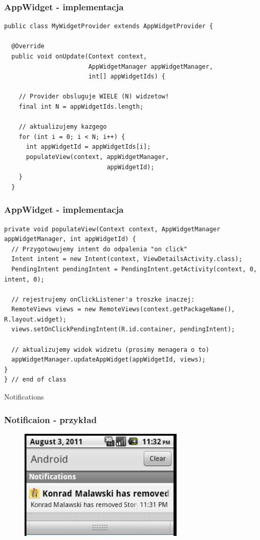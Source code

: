 \begin{frame}[fragile]\frametitle{AppWidget - implementacja}
\begin{lstlisting}
public class MyWidgetProvider extends AppWidgetProvider {

  @Override
  public void onUpdate(Context context, 
                       AppWidgetManager appWidgetManager, 
                       int[] appWidgetIds) {

    // Provider obsluguje WIELE (N) widzetow!
    final int N = appWidgetIds.length;

    // aktualizujemy kazgego
    for (int i = 0; i < N; i++) {
      int appWidgetId = appWidgetIds[i];
      populateView(context, appWidgetManager, 
                            appWidgetId);
    }
  }
\end{lstlisting}
\end{frame}

\begin{frame}[fragile]\frametitle{AppWidget - implementacja}
\begin{lstlisting}
private void populateView(Context context, AppWidgetManager appWidgetManager, int appWidgetId) {
  // Przygotowujemy intent do odpalenia "on click"
  Intent intent = new Intent(context, ViewDetailsActivity.class);
  PendingIntent pendingIntent = PendingIntent.getActivity(context, 0, intent, 0);

  // rejestrujemy onClickListener'a troszke inaczej:
  RemoteViews views = new RemoteViews(context.getPackageName(), R.layout.widget);
  views.setOnClickPendingIntent(R.id.container, pendingIntent);
 
  // aktualizujemy widok widzetu (prosimy menagera o to)
  appWidgetManager.updateAppWidget(appWidgetId, views);
}
} // end of class
\end{lstlisting}
\end{frame}



\begin{frame}
\begin{center}
\Huge{Notifications}
\end{center}
\end{frame}

\begin{frame}\frametitle{Notificaion - przykład}
\begin{figure}
 \centering
 \includegraphics[width=0.7\textwidth]{images/notification_android_2_2}
\end{figure}
\end{frame}


